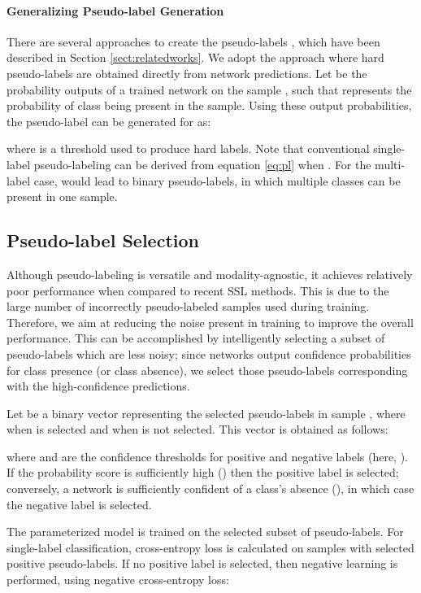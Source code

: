 \documentclass{article} \usepackage{iclr2021_conference,times}
\begin{document}
\paragraph{Generalizing Pseudo-label Generation}
There are several approaches to create the pseudo-labels , which have been described in Section \ref{sect:relatedworks}. We adopt the approach where hard pseudo-labels are obtained directly from network predictions. Let  be the probability outputs of a trained network on the sample , such that  represents the probability of class  being present in the sample. Using these output probabilities, the pseudo-label can be generated for  as:


where  is a threshold used to produce hard labels. Note that conventional single-label pseudo-labeling can be derived from equation \ref{eq:pl} when . For the multi-label case,  would lead to binary pseudo-labels, in which multiple classes can be present in one sample.


\subsection{Pseudo-label Selection} 
Although pseudo-labeling is versatile and modality-agnostic, it achieves relatively poor performance when compared to recent SSL methods. This is due to the large number of incorrectly pseudo-labeled samples used during training. Therefore, we aim at reducing the noise present in training to improve the overall performance. This can be accomplished by intelligently selecting a subset of pseudo-labels which are less noisy; since networks output confidence probabilities for class presence (or class absence), we select those pseudo-labels corresponding with the high-confidence predictions.

Let  be a binary vector representing the selected pseudo-labels in sample 
, where  when  is selected and  when  is not selected. This vector is obtained as follows:

where  and  are the confidence thresholds for positive and negative labels (here, ). If the probability score is sufficiently high () then the positive label is selected; conversely, a network is sufficiently confident of a class's absence (), in which case the negative label is selected.

The parameterized model  is  trained on the selected subset of pseudo-labels. For single-label classification, cross-entropy loss is calculated on samples with selected positive pseudo-labels.
If no positive label is selected, then negative learning is performed, using negative cross-entropy loss:
\end{document}

